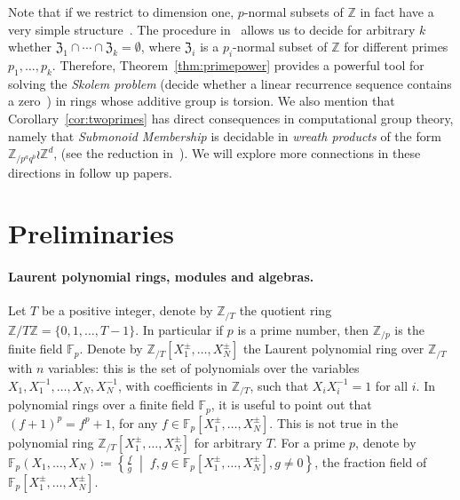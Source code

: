 \documentclass[letterpaper, 11pt, thm-restate]{article}
\numberwithin{equation}{section}
\newcommand{\Z}{\mathbb{Z}}
\newcommand{\F}{\mathbb{F}}
\newcommand{\ZT}{\mathbb{Z}_{/T}}
\newcommand{\mZ}{\mathfrak{Z}}
\newcommand{\ba}{\boldsymbol{a}}
\newcommand{\oX}{\mkern 1.5mu\overline{\mkern-1.5mu X \mkern-1.5mu}\mkern 1.5mu}
\theoremstyle{definition}
\theoremstyle{definition}
\theoremstyle{definition}
\begin{document}
Note that if we restrict to dimension one, $p$-normal subsets of $\Z$ in fact have a very simple structure~\cite[p.116]{derksen2015linear}.
The procedure in~\cite[Theorem~3.2]{karimov2025decidability} allows us to decide for arbitrary $k$ whether $\mZ_1 \cap \cdots \cap \mZ_k = \emptyset$, where $\mZ_i$ is a $p_i$-normal subset of $\Z$ for different primes $p_1, \ldots, p_k$.
Therefore, Theorem~\ref{thm:primepower} provides a powerful tool for solving the \emph{Skolem problem} (decide whether a linear recurrence sequence contains a zero~\cite{ouaknine2015linear, lipton2022skolem}) in rings whose additive group is torsion.
We also mention that Corollary~\ref{cor:twoprimes} has direct consequences in computational group theory, namely that \emph{Submonoid Membership} is decidable in \emph{wreath products} of the form $\Z_{/p^a q^b} \wr \Z^d$, (see the reduction in~\cite{dong2024submonoid}).
We will explore more connections in these directions in follow up papers.

\section{Preliminaries}\label{sec:prelim}

\paragraph*{Laurent polynomial rings, modules and algebras.}

Let $T$ be a positive integer, denote by $\ZT$ the quotient ring $\Z/T\Z = \{0, 1, \ldots, T-1\}$.
In particular if $p$ is a prime number, then $\Z_{/p}$ is the finite field $\F_p$.
Denote by $\ZT[X_1^{\pm}, \ldots, X_N^{\pm}]$ the Laurent polynomial ring over $\ZT$ with $n$ variables: this is the set of polynomials over the variables $X_1, X_1^{-1}, \ldots, X_N, X_N^{-1}$, with coefficients in $\ZT$, such that $X_i X_i^{-1} = 1$ for all $i$.
In polynomial rings over a finite field $\F_p$, it is useful to point out that $(f + 1)^p = f^p + 1$, for any $f \in \F_p[X_1^{\pm}, \ldots, X_N^{\pm}]$.
This is not true in the polynomial ring $\ZT[X_1^{\pm}, \ldots, X_N^{\pm}]$ for arbitrary $T$.
For a prime $p$, denote by $\F_p(X_1, \ldots, X_N) \coloneqq \left\{\frac{f}{g} \;\middle|\; f, g \in \F_p[X_1^{\pm}, \ldots, X_N^{\pm}], g \neq 0 \right\}$, the fraction field of $\F_p[X_1^{\pm}, \ldots, X_N^{\pm}]$.
\end{document}
